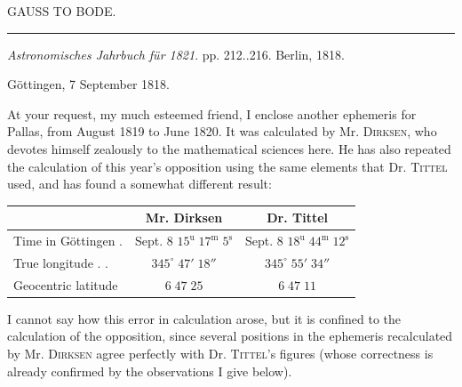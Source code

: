 \clearpage
{}
\hypertarget{native-419-part-lower}{}\label{native-419-part-lower}
\begin{center}
\Large GAUSS TO BODE.
\end{center}

\begin{center}
\rule{6cm}{0.4pt}

\textit{Astronomisches Jahrbuch für 1821}. pp. 212..216. Berlin, 1818.
\end{center}

\begin{flushright}Göttingen, 7 September 1818.\end{flushright}

\par\indent At your request, my much esteemed friend, I enclose another ephemeris for Pallas, from August 1819 to June 1820. It was calculated by Mr. \textsc{Dirksen}, who devotes himself zealously to the mathematical sciences here. He has also repeated the calculation of this year’s opposition using the same elements that Dr. \textsc{Tittel} used, and has found a somewhat different result:

\begin{center}
\setlength{\tabcolsep}{3pt}
\begin{tabular}{l|c|c}
 & Mr. Dirksen & Dr. Tittel \\
\hline
Time in Göttingen . & \shortstack{Sept. 8\\$15^{\mathrm u}\;17^{\mathrm m}\;5^{\mathrm s}$} & \shortstack{Sept. 8\\$18^{\mathrm u}\;44^{\mathrm m}\;12^{\mathrm s}$} \\
True longitude . . & $345^\circ\;47'\;18''$ & $345^\circ\;55'\;34''$ \\
Geocentric latitude & $6\;47\;25$ & $6\;47\;11$ \\
\end{tabular}
\end{center}

\par\indent I cannot say how this error in calculation arose, but it is confined to the calculation of the opposition, since several positions in the  ephemeris recalculated by Mr. \textsc{Dirksen} agree perfectly with Dr. \textsc{Tittel}’s figures (whose correctness is already confirmed by the observations I give below).

